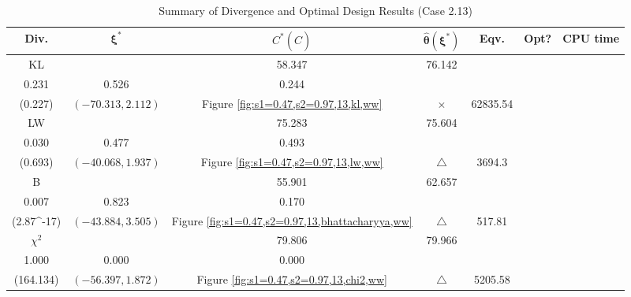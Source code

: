 \documentclass[12pt, a4paper]{article}
\begin{document}
\begin{table}[H]
\centering
\renewcommand{\arraystretch}{1.5} %
\setlength{\tabcolsep}{8pt} %
\begin{tabular}{|c|c|c|c|c|c|c|}
\hline
\textbf{Div.} & \(\boldsymbol{\xi^*}\) & \(C^* (\hat{C})\) & \(\boldsymbol{\hat{\theta}(\xi^*)}\) & \textbf{Eqv.} & \textbf{Opt?} & \textbf{CPU time} \\
\hline
KL & \(\left\{\begin{array}{ccc}
41.993 & 58.347 & 76.142 \\
0.231 & 0.526 & 0.244
\end{array}\right\}\) &
\(\begin{array}{c}
0.303 \\
(0.227)
\end{array}\) & 
\((-70.313, 2.112)\) & 
Figure \ref{fig:s1=0.47,s2=0.97,13,kl,ww} & $\times$ & 62835.54 \\
\hline
LW & \(\left\{\begin{array}{ccc}
74.778 & 75.283 & 75.604 \\
0.030 & 0.477 & 0.493
\end{array}\right\}\) &
\(\begin{array}{c}
0.351 \\
(0.693)
\end{array}\) & 
\((-40.068, 1.937)\) & 
Figure \ref{fig:s1=0.47,s2=0.97,13,lw,ww} & $\triangle$ & 3694.3 \\
\hline
B & \(\left\{\begin{array}{ccc}
48.499 & 55.901 & 62.657 \\
0.007 & 0.823 & 0.170
\end{array}\right\}\) &
\(\begin{array}{c}
0 \\
(2.87\times 10^{-17})
\end{array}\) & 
\((-43.884, 3.505)\) & 
Figure \ref{fig:s1=0.47,s2=0.97,13,bhattacharyya,ww} & $\triangle$ & 517.81 \\
\hline
\(\chi^2\) & \(\left\{\begin{array}{ccc}
65.965 & 79.806 & 79.966 \\
1.000 & 0.000 & 0.000
\end{array}\right\}\) &
\(\begin{array}{c}
167.956 \\
(164.134)
\end{array}\) & 
\((-56.397, 1.872)\) & 
Figure \ref{fig:s1=0.47,s2=0.97,13,chi2,ww} & $\triangle$ & 5205.58 \\
\hline
\end{tabular}
\caption{Summary of Divergence and Optimal Design Results (Case 2.13)}
\label{tab:results2.13}
\end{table}
\end{document}
